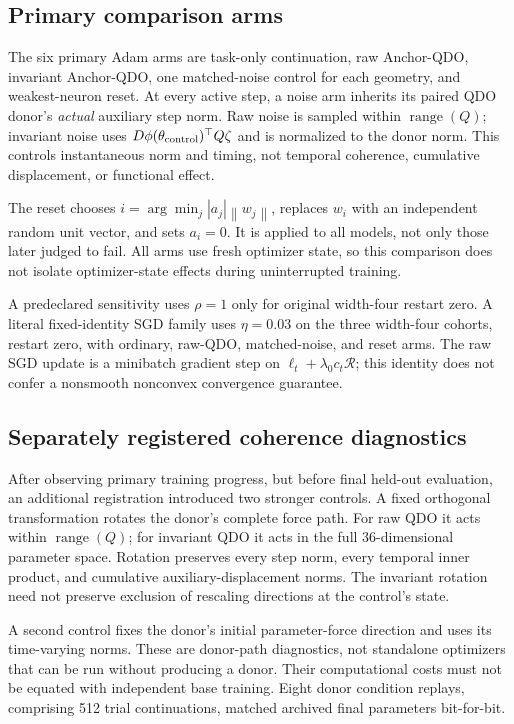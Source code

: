 \documentclass[11pt,letterpaper]{article}
\theoremstyle{remark}\newtheorem{remark}{Remark}
\newcommand{\range}{\operatorname{range}}
\newcommand{\norm}[1]{\left\lVert#1\right\rVert}
\begin{document}
\subsection{Primary comparison arms}
The six primary Adam arms are task-only continuation, raw Anchor-QDO, invariant Anchor-QDO, one matched-noise control for each geometry, and weakest-neuron reset. At every active step, a noise arm inherits its paired QDO donor's \emph{actual} auxiliary step norm. Raw noise is sampled within $\range(Q)$; invariant noise uses $D\phi(\theta_{\rm control})^\top Q\zeta$ and is normalized to the donor norm. This controls instantaneous norm and timing, not temporal coherence, cumulative displacement, or functional effect.

The reset chooses $i=\arg\min_j |a_j|\norm{w_j}$, replaces $w_i$ with an independent random unit vector, and sets $a_i=0$. It is applied to all models, not only those later judged to fail. All arms use fresh optimizer state, so this comparison does not isolate optimizer-state effects during uninterrupted training.

A predeclared sensitivity uses $\rho=1$ only for original width-four restart zero. A literal fixed-identity SGD family uses $\eta=0.03$ on the three width-four cohorts, restart zero, with ordinary, raw-QDO, matched-noise, and reset arms. The raw SGD update is a minibatch gradient step on $\ell_t+\lambda_0c_t\mathcal R$; this identity does not confer a nonsmooth nonconvex convergence guarantee.

\subsection{Separately registered coherence diagnostics}
After observing primary training progress, but before final held-out evaluation, an additional registration introduced two stronger controls. A fixed orthogonal transformation rotates the donor's complete force path. For raw QDO it acts within $\range(Q)$; for invariant QDO it acts in the full 36-dimensional parameter space. Rotation preserves every step norm, every temporal inner product, and cumulative auxiliary-displacement norms. The invariant rotation need not preserve exclusion of rescaling directions at the control's state.

A second control fixes the donor's initial parameter-force direction and uses its time-varying norms. These are donor-path diagnostics, not standalone optimizers that can be run without producing a donor. Their computational costs must not be equated with independent base training. Eight donor condition replays, comprising 512 trial continuations, matched archived final parameters bit-for-bit.
\end{document}
